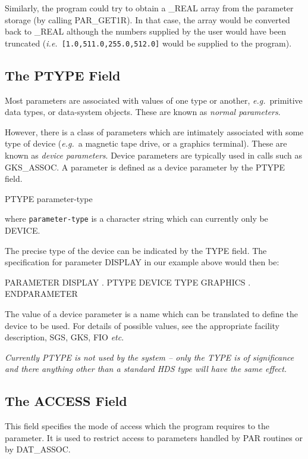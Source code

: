 \documentclass[twoside,11pt,nolof]{starlink}
\begin{document}
Similarly, the program could try to obtain a \_REAL array from the
parameter storage (by calling PAR\_GET1R)\@. In that case, the array would be
converted back to \_REAL although the numbers supplied by the user would have
been truncated (\emph{i.e.}\ \texttt{[1.0,511.0,255.0,512.0]} would be supplied
to the program).

\subsection{The PTYPE Field}

Most parameters are associated with values of one type or another, \emph{e.g.}\
primitive data types, or data-system objects. These are known as \emph{normal
parameters}.

However, there is a class of parameters which are intimately associated with
some type of device (\emph{e.g.}\ a magnetic tape drive, or a graphics terminal).
These are known as \emph{device parameters}.
Device parameters are typically used in calls such as GKS\_ASSOC.
A parameter is defined as a device parameter by the PTYPE field.
\begin{terminalv}
PTYPE  parameter-type
\end{terminalv}
where \texttt{parameter-type} is a character string which can currently only be
DEVICE.

The precise type of the device can be indicated by the TYPE field.
The specification for parameter DISPLAY in our example above would then be:
\begin{terminalv}
PARAMETER DISPLAY
      .
   PTYPE DEVICE
   TYPE GRAPHICS
      .
ENDPARAMETER
\end{terminalv}
The value of a device parameter is
a name which can be translated to define the device to be used.
For details of possible values, see the appropriate facility description,
SGS, GKS, FIO \emph{etc}.

\emph{Currently PTYPE is not used by the system -- only the TYPE is of significance
and there anything other than a standard HDS type will have the same effect.}

\subsection{The ACCESS Field}

This field specifies the mode of access which the program
requires to the parameter.
It is used to restrict access to parameters handled by PAR routines or by
DAT\_ASSOC.
\end{document}
